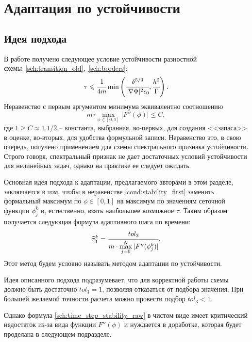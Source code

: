 
\section{Адаптация по устойчивости}

\subsection{Идея подхода}

В работе \cite{ponomarev_stability} получено следующее условие устойчивости разностной схемы~\eqref{sch:transition_old},~\eqref{sch:borders}:
\[
	\tau \leqslant \cfrac{1}{4m} \min \left( \cfrac{\delta^{5/3}}{|\nabla \Phi|^2 \epsilon_0}, \cfrac{h^2}{\Gamma} \right).
\]
Неравенство с первым аргументом минимума эквивалентно соотношению
\begin{equation}
	m \tau \max\limits_{\phi \in [0, 1]} |F''(\phi)| \leqslant C,
	\label{cond:stability_first}
\end{equation}
где $1 \geqslant C \approx 1.1 / 2$ -- константа, выбранная, во-первых, для создания <<запаса>> в оценке, во-вторых, для удобства формульной записи. Неравенство это, в свою очередь, получено применением для схемы спектрального признака устойчивости. Строго говоря, спектральный признак не дает достаточных условий устойчивости для нелинейных задач, однако на практике ее следует ожидать.

Основная идея подхода к адаптации, предлагаемого авторами в этом разделе, заключается в том, чтобы в неравенстве \eqref{cond:stability_first} заменить формальный максимум по $\phi \in [0, 1]$ на максимум по значениям сеточной функции $\phi_j^k$ и, естественно, взять наибольшее возможное $\tau$. Таким образом получается следующая формула адаптивного шага по времени:
\begin{equation}
	\widetilde{\tau}_3^k = \cfrac{tol_3}{m \cdot \max\limits_{j = 0}^N |F''(\phi_j^k)|}.
	\label{sch:time_step_stability_raw}
\end{equation}
Этот метод будем условно называть методом адаптации по устойчивости.

Идея описанного подхода подразумевает, что для корректной работы схемы должно быть достаточно $tol_3 = 1$, позволяя отказаться от подбора значения. При большей желаемой точности расчета можно провести подбор $tol_3 < 1$.

Однако формула \eqref{sch:time_step_stability_raw} в чистом виде имеет критический недостаток из-за вида функции $F''(\phi)$ и нуждается в доработке, которая будет проделана в следующем подразделе.


